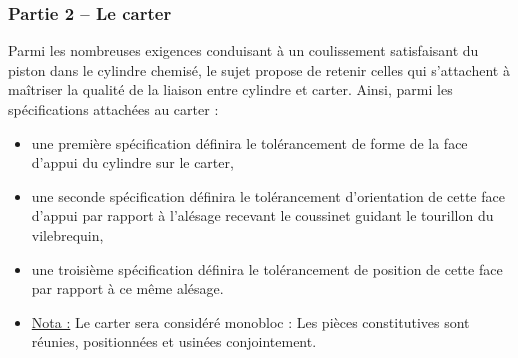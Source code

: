 \subsubsection{Partie 2 -- Le carter}
Parmi les nombreuses exigences conduisant à un coulissement satisfaisant du piston dans le cylindre chemisé, le sujet propose de retenir celles qui s'attachent à maîtriser la qualité de la liaison entre cylindre et carter. Ainsi, parmi les spécifications attachées au carter :
\begin{itemize}
\item une première spécification définira le tolérancement de forme de la face d'appui du cylindre sur le carter,
\item une seconde spécification définira le tolérancement d'orientation de cette face d'appui par rapport à l'alésage recevant le coussinet guidant le tourillon du vilebrequin,
\item une troisième spécification définira le tolérancement de position de cette face par rapport à ce même alésage.
\item \underline{Nota :} Le carter sera considéré monobloc : Les pièces constitutives sont réunies, positionnées et usinées conjointement.
\end{itemize}

